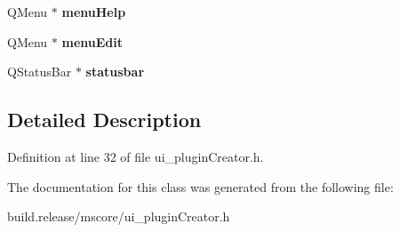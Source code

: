\begin{DoxyCompactItemize}
\mbox{\label{class_ui___plugin_creator_base_a20ec55dcbc240e1b3490264f1fc1b1c6}} 
Q\+Menu $\ast$ {\bfseries menu\+Help}
\item 
\mbox{\label{class_ui___plugin_creator_base_ac26e6e8d4dddd22208eb3e1f47be94c1}} 
Q\+Menu $\ast$ {\bfseries menu\+Edit}
\item 
\mbox{\label{class_ui___plugin_creator_base_a19e0ab0a3ad1d1f8dc214555e1f3e2de}} 
Q\+Status\+Bar $\ast$ {\bfseries statusbar}
\end{DoxyCompactItemize}


\subsection{Detailed Description}


Definition at line 32 of file ui\+\_\+plugin\+Creator.\+h.



The documentation for this class was generated from the following file\+:\begin{DoxyCompactItemize}
\item 
build.\+release/mscore/ui\+\_\+plugin\+Creator.\+h\end{DoxyCompactItemize}
